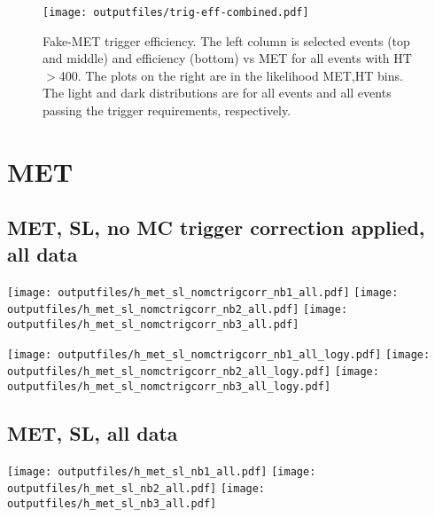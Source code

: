 \documentclass[11pt]{article}
\begin{document}
    \begin{figure}
     \begin{center}
     \texttt{[image: outputfiles/trig-eff-combined.pdf]}
     \caption{Fake-MET trigger efficiency.  The left column is selected
          events (top and middle) and efficiency (bottom) vs MET for
          all events with HT$>$400.
          The plots on the right are in the likelihood MET,HT bins.
          The light and dark distributions are for all events and
          all events passing the trigger requirements, respectively.
          }
     \end{center}
    \end{figure}



  \pagebreak
  \clearpage




    \section{MET}
     \subsection{ MET, SL, no MC trigger correction applied, all data}

    \noindent
     \texttt{[image: outputfiles/h\_met\_sl\_nomctrigcorr\_nb1\_all.pdf]}
     \texttt{[image: outputfiles/h\_met\_sl\_nomctrigcorr\_nb2\_all.pdf]}
     \texttt{[image: outputfiles/h\_met\_sl\_nomctrigcorr\_nb3\_all.pdf]}

    \noindent
     \texttt{[image: outputfiles/h\_met\_sl\_nomctrigcorr\_nb1\_all\_logy.pdf]}
     \texttt{[image: outputfiles/h\_met\_sl\_nomctrigcorr\_nb2\_all\_logy.pdf]}
     \texttt{[image: outputfiles/h\_met\_sl\_nomctrigcorr\_nb3\_all\_logy.pdf]}


     \subsection{ MET, SL, all data}

    \noindent
     \texttt{[image: outputfiles/h\_met\_sl\_nb1\_all.pdf]}
     \texttt{[image: outputfiles/h\_met\_sl\_nb2\_all.pdf]}
     \texttt{[image: outputfiles/h\_met\_sl\_nb3\_all.pdf]}
\end{document}
